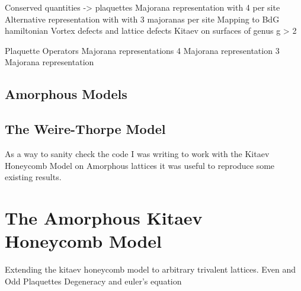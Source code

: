 




	        Conserved quantities -> plaquettes
			Majorana representation with 4 per site
			Alternative representation with with 3 majoranas per site
			Mapping to BdG hamiltonian
			Vortex defects and lattice defects
		    Kitaev on surfaces of genus g > 2

Plaquette Operators
Majorana representations
4 Majorana representation
3 Majorana representation
		    
\subsection{Amorphous Models}
			\subsection{The Weire-Thorpe Model}
			As a way to sanity check the code I was writing to work with the Kitaev Honeycomb Model on Amorphous lattices it was useful to reproduce some existing results. 
		
	

\section{The Amorphous Kitaev Honeycomb Model}
		Extending the kitaev honeycomb model to arbitrary trivalent lattices.
		Even and Odd Plaquettes
        Degeneracy and euler's equation

